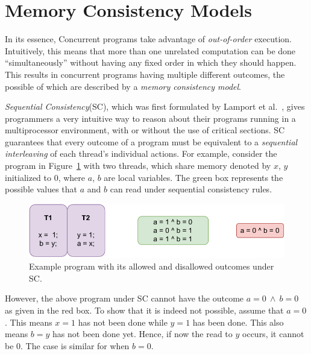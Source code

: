 \section{Memory Consistency Models}

    In its essence, Concurrent programs take advantage of \textit{out-of-order} execution. 
    Intuitively, this means that more than one unrelated computation can be done ``simultaneously'' without having any fixed order in which they should happen.
    This results in concurrent programs having multiple different outcomes, the possible of which are described by a \textit{memory consistency model}. 
    
    \textit{Sequential Consistency}(SC), which was first formulated by Lamport et al.~\cite{Lamport79}, gives programmers a very intuitive way to reason about their programs running in a multiprocessor environment, with or without the use of critical sections.
    SC guarantees that every outcome of a program must be equivalent to a \textit{sequential interleaving} of each thread's individual actions. 
    For example, consider the program in Figure~\ref{intro:Example} with two threads, which share memory denoted by $x$, $y$ initialized to 0, where $a$, $b$ are local variables. 
    The green box represents the possible values that $a$ and $b$ can read under sequential consistency rules.
    \begin{figure}[H]
        \centering
        \includegraphics[scale=0.7]{2.Background/SC_Example1(a).pdf}
        \caption{Example program with its allowed and disallowed outcomes under SC.}
        \label{intro:Example}
    \end{figure}
    
    However, the above program under SC cannot have the outcome $a=0\ \wedge\ b=0$ as given in the red box. 
    To show that it is indeed not possible, assume that $a=0$. This means $x=1$ has not been done while $y=1$ has been done. 
    This also means $b=y$ has not been done yet. 
    Hence, if now the read to $y$ occurs, it cannot be $0$. The case is similar for when $b=0$. 
    
